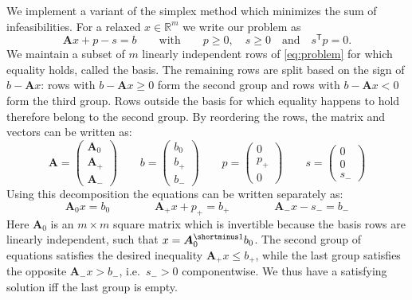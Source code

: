 \documentclass[a4paper, 12pt]{article}
\newcommand{\R} {\mathbb{R}}
\newcommand{\minv} { {\shortminus1} }
\newcommand{\mtrp} {\mathsf{T}}
\begin{document}
We implement a variant of the simplex method which minimizes the sum of infeasibilities. For a relaxed $x \in \R^m$ we write our problem as
\begin{equation*}
\bm{A} x + p - s = b \qquad \text{with} \qquad p \geq 0,\quad s \geq 0 \quad \text{and} \quad s^\mtrp p = 0.
\end{equation*}
We maintain a subset of $m$ linearly independent rows of \eqref{eq:problem} for which equality holds, called the basis. The remaining rows are split based on the sign of $b - \bm{A} x$: rows with $b - \bm{A} x \geq 0$ form the second group and rows with $b - \bm{A} x < 0$ form the third group. Rows outside the basis for which equality happens to hold therefore belong to the second group. By reordering the rows, the matrix and vectors can be written as:
\begin{equation*}
\bm{A} = \begin{pmatrix} \bm{A}_0 \\ \bm{A}_+ \\ \bm{A}_- \end{pmatrix} \qquad
b = \begin{pmatrix} b_0 \\ b_+ \\ b_-\end{pmatrix} \qquad
p = \begin{pmatrix} 0 \\ p_+ \\ 0 \end{pmatrix} \qquad
s = \begin{pmatrix} 0 \\ 0 \\ s_- \end{pmatrix}
\end{equation*}
Using this decomposition the equations can be written separately as:
\begin{equation*}
\bm{A}_0 x = b_0 \qquad\qquad \bm{A}_+ x + p_+ = b_+ \qquad\qquad \bm{A}_- x - s_- = b_-
\end{equation*}
Here $\bm{A}_0$ is an $m \times m$ square matrix which is invertible because the basis rows are linearly independent, such that $x = \bm{A}_0^\minv b_0$. The second group of equations satisfies the desired inequality $\bm{A}_+ x \leq b_+$, while the last group satisfies the opposite $\bm{A}_- x > b_-$, i.e.\ $s_- > 0$ componentwise. We thus have a satisfying solution iff the last group is empty.
\end{document}
